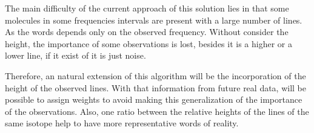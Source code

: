 \documentclass[twocolumn, draft]{emulateapj}
\begin{document}
The main difficulty of the current approach of this solution lies in that some molecules in some frequencies intervals are present with a large number of lines. As the words depends only on the observed frequency. Without consider the height, the importance of some observations is lost, besides it is a higher or a lower line, if it exist of it is just noise.

Therefore, an natural extension of this algorithm will be the incorporation of the height of the observed lines. With that information from future real data, will be possible to assign weights to avoid making this generalization of the importance of the observations. Also, one ratio between the relative heights of the lines of the same isotope help to have more representative words of reality.



\end{document}
